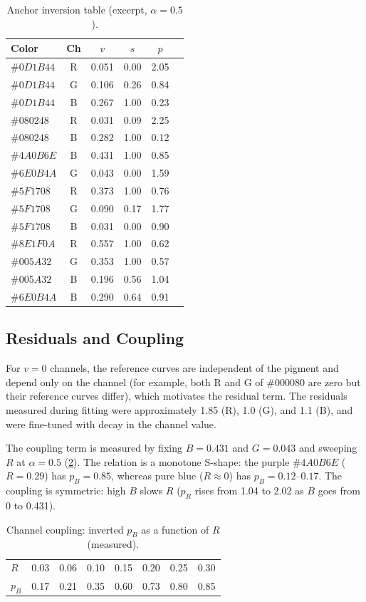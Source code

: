 \begin{table}[t]
\centering
\small
\caption{Anchor inversion table (excerpt, $\alpha=0.5$).}
\label{tab:d2}
\begin{tabular}{lccccc}
\toprule
Color & Ch & $v$ & $s$ & $p$ \\
\midrule
$\#0D1B44$ & R & 0.051 & 0.00 & 2.05 \\
$\#0D1B44$ & G & 0.106 & 0.26 & 0.84 \\
$\#0D1B44$ & B & 0.267 & 1.00 & 0.23 \\
$\#080248$ & R & 0.031 & 0.09 & 2.25 \\
$\#080248$ & B & 0.282 & 1.00 & 0.12 \\
$\#4A0B6E$ & B & 0.431 & 1.00 & 0.85 \\
$\#6E0B4A$ & G & 0.043 & 0.00 & 1.59 \\
$\#5F1708$ & R & 0.373 & 1.00 & 0.76 \\
$\#5F1708$ & G & 0.090 & 0.17 & 1.77 \\
$\#5F1708$ & B & 0.031 & 0.00 & 0.90 \\
$\#8E1F0A$ & R & 0.557 & 1.00 & 0.62 \\
$\#005A32$ & G & 0.353 & 1.00 & 0.57 \\
$\#005A32$ & B & 0.196 & 0.56 & 1.04 \\
$\#6E0B4A$ & B & 0.290 & 0.64 & 0.91 \\
\bottomrule
\end{tabular}
\end{table}

\subsection{Residuals and Coupling}
For $v=0$ channels, the reference curves are independent of the pigment and depend only on the channel (for example, both R and G of $\#000080$ are zero but their reference curves differ), which motivates the residual term. The residuals measured during fitting were approximately 1.85 (R), 1.0 (G), and 1.1 (B), and were fine-tuned with decay in the channel value.

The coupling term is measured by fixing $B=0.431$ and $G=0.043$ and sweeping $R$ at $\alpha=0.5$ (\cref{tab:d3}). The relation is a monotone S-shape: the purple $\#4A0B6E$ ($R=0.29$) has $p_{B}=0.85$, whereas pure blue ($R\approx0$) has $p_{B}=0.12$--$0.17$. The coupling is symmetric: high $B$ slows $R$ ($p_{R}$ rises from 1.04 to 2.02 as $B$ goes from 0 to 0.431).

\begin{table}[t]
\centering
\small
\caption{Channel coupling: inverted $p_{B}$ as a function of $R$ (measured).}
\label{tab:d3}
\begin{tabular}{lccccccc}
\toprule
$R$ & 0.03 & 0.06 & 0.10 & 0.15 & 0.20 & 0.25 & 0.30 \\
$p_{B}$ & 0.17 & 0.21 & 0.35 & 0.60 & 0.73 & 0.80 & 0.85 \\
\bottomrule
\end{tabular}
\end{table}

